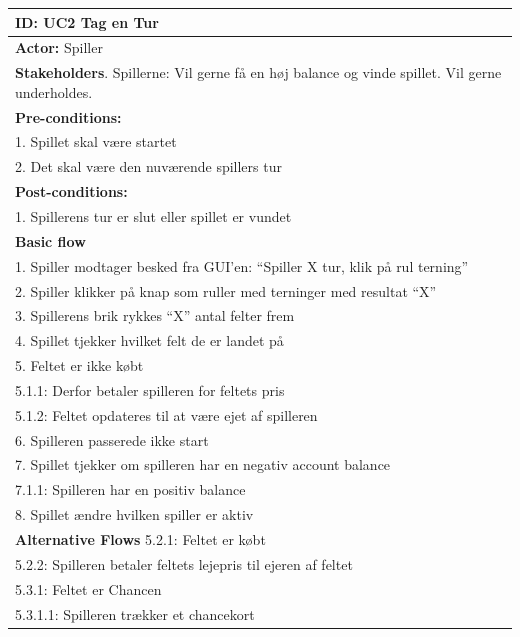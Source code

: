 \begin{table}[H]
    \renewcommand{\arraystretch}{1.5}
    \centering
    \begin{tabular}{|p{14cm}|}
        \hline
        \textbf{ID:} UC2 Tag en Tur\\
        \hline
        \textbf{Actor:} Spiller\\
        \hline
        \textbf{Stakeholders}. Spillerne: Vil gerne få en høj balance og vinde spillet. Vil gerne underholdes.\\
        \hline
        \textbf{Pre-conditions:}\\
        1. Spillet skal være startet\\
        2. Det skal være den nuværende spillers tur\\
        \hline
        \textbf{Post-conditions:}\\
        1. Spillerens tur er slut eller spillet er vundet \\
        \hline
        \textbf{Basic flow} \\
        1. Spiller modtager besked fra GUI’en: “Spiller X tur, klik på rul terning” \\
        2. Spiller klikker på knap som ruller med terninger med resultat “X”\\
        3. Spillerens brik rykkes “X” antal felter frem\\
        4. Spillet tjekker hvilket felt de er landet på\\
        5. Feltet er ikke købt \\
        \hspace{0.2cm}5.1.1: Derfor betaler spilleren for feltets pris\\
        \hspace{0.2cm}5.1.2: Feltet opdateres til at være ejet af spilleren\\
        6. Spilleren passerede ikke start \\
        7. Spillet tjekker om spilleren har en negativ account balance \\
        7.1.1: Spilleren har en positiv balance \\
        8. Spillet ændre hvilken spiller er aktiv \\
        \hline
        \textbf{Alternative Flows}
        5.2.1: Feltet er købt \\
        5.2.2: Spilleren betaler feltets lejepris til ejeren af feltet \\
        5.3.1: Feltet er Chancen \\
        5.3.1.1: Spilleren trækker et chancekort \\

\end{tabular}
\end{table}
